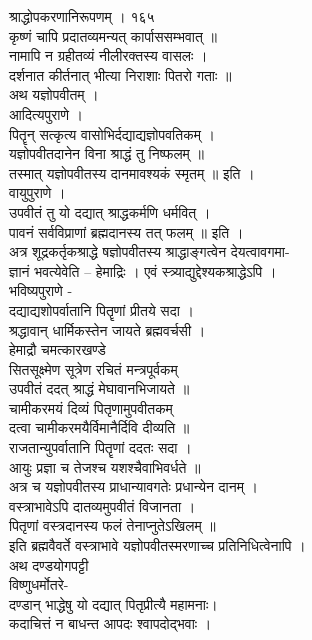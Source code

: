\documentclass[11pt, openany]{book}
\begin{document}
{{{{{{{{{{{{{{{{{{{{{{{{{{{{{{{{{{{{{{{{{{{{{{{{{{{{{{{{{{{{{{{{{{{{{{{{{{{{{{{{{{{{{{{{{{{{{{{{{{{{{{{{{{{{{{ श्राद्धोपकरणानिरूपणम् । १६५\\
कृष्णं चापि प्रदातव्यमन्यत् कार्पाससम्भवात् ॥\\
नामापि न ग्रहीतव्यं नीलीरक्तस्य वासलः ।\\
दर्शनात कीर्तनात् भीत्या निराशाः पितरो गताः ॥\\
अथ यज्ञोपवीतम् ।\\
आदित्यपुराणे ।\\
पितॄन् सत्कृत्य वासोभिर्दद्याद्यज्ञोपवतिकम् ।\\
यज्ञोपवीतदानेन विना श्राद्धं तु निष्फलम् ॥\\
तस्मात् यज्ञोपवीतस्य दानमावश्यकं स्मृतम् ॥ इति ।\\
वायुपुराणे ।\\
उपवीतं तु यो दद्यात् श्राद्धकर्मणि धर्मवित् ।\\
पावनं सर्वविप्राणां ब्रह्मदानस्य तत् फलम् ॥ इति ।\\
अत्र शूद्रकर्तृकश्राद्धे षज्ञोपवीतस्य श्राद्धाङ्गत्वेन देयत्वावगमा-\\
ज्ञानं भवत्येवेति -- हेमाद्रिः । एवं स्त्र्याद्युद्देश्यकश्राद्धेऽपि ।\\
भविष्यपुराणे -\\
दद्याद्यशोपर्वातानि पितॄणां प्रीतये सदा ।\\
श्रद्धावान् धार्मिकस्तेन जायते ब्रह्मवर्चसी ।\\
हेमाद्रौ चमत्कारखण्डे \textbar{}\\
सितसूक्ष्मेण सूत्रेण रचितं मन्त्रपूर्वकम् \textbar{}\\
उपवीतं ददत् श्राद्धं मेघावानभिजायते ॥\\
चामीकरमयं दिव्यं पितृणामुपवीतकम् \textbar{}\\
दत्वा चामीकरमयैर्विमानैर्दिवि दीव्यति ॥\\
राजतान्युपर्वातानि पितॄणां ददतः सदा ।\\
आयुः प्रज्ञा च तेजश्च यशश्चैवाभिवर्धते ॥\\
अत्र च यज्ञोपवीतस्य प्राधान्यावगतेः प्रधान्येन दानम् ।\\
वस्त्राभावेऽपि दातव्यमुपवीतं विजानता ।\\
पितृणां वस्त्रदानस्य फलं तेनाप्नुतेऽखिलम् ॥\\
इति ब्रह्मवैवर्ते वस्त्राभावे यज्ञोपवीतस्मरणाच्च प्रतिनिधित्वेनापि ।\\
अथ दण्डयोगपट्टी \textbar{}\\
विष्णुधर्मोतरे-\\
दण्डान् भाद्धेषु यो दद्यात् पितृप्रीत्यै महामनाः।\\
कदाचित्तं न बाधन्त आपदः श्वापदोद्भवाः ।\\


}}}}}}}}}}}}}}}}}}}}}}}}}}}}}}}}}}}}}}}}}}}}}}}}}}}}}}}}}}}}}}}}}}}}}}}}}}}}}}}}}}}}}}}}}}}}}}}}}}}}}}}}}}}}}}
\end{document}
